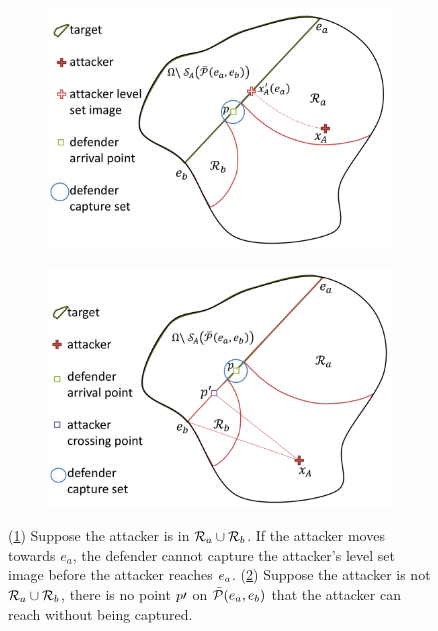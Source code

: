 \begin{figure}
\centering
	\begin{subfigure}{0.35\textwidth}
	\centering
	\includegraphics[width=\textwidth]{"fig/attacker in Ra"}
	\caption{\label{subfig:ainra}}
	\end{subfigure} \quad
	\begin{subfigure}{0.35\textwidth}
	\centering
	\includegraphics[width=\textwidth]{"fig/attacker outside Ra U Rb"}
	\caption{\label{subfig:aoutra}}
	\end{subfigure}
\caption{(\ref{subfig:ainra}) Suppose the attacker is in $\mathcal{R}_a\cup\mathcal{R}_b$. If the attacker moves towards $e_a$, the defender cannot capture the attacker's level set image before the attacker reaches $e_a$. (\ref{subfig:aoutra}) Suppose the attacker is not $\mathcal{R}_a\cup\mathcal{R}_b$, there is no point $p\prime$ on $\bar{\mathcal{P}}(e_a,e_b)$ that the attacker can reach without being captured.}
\label{fig:lemma1}
\end{figure}

